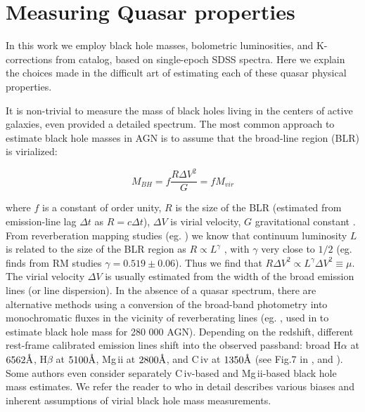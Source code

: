 \documentclass[twocolumn]{aastex62}
\let\oldAA\AA
\renewcommand{\AA}{\text{\normalfont\oldAA}}
\begin{document}
\appendix
\section{Measuring Quasar properties} 
\label{app:measureBHmass}
In this work we employ black hole masses, bolometric luminosities, and K-corrections from \cite{shen2011} catalog, based on single-epoch SDSS spectra. Here we explain the choices made in the difficult art of estimating each of these quasar physical properties.

It is non-trivial to measure the mass of black holes living in the centers of active galaxies, even provided a detailed spectrum. The most common  approach to estimate black hole masses in AGN is to assume that the broad-line region (BLR) is virialized:


\begin{equation}
M_{BH} = f \frac{ R\Delta V^{2} }{G} = f M_{vir}
\end{equation}


where $f$ is a constant of order unity, $R$ is the size of the BLR (estimated from  emission-line lag $\Delta t$ as $R = c \Delta t$), $\Delta V$ is virial velocity, $G$ gravitational constant \citep{shen2008}.  From reverberation mapping studies (eg. \citealt{shen2018}) we know that continuum luminosity $L$ is related to the size of the BLR region as $R \propto L^{\gamma}$ \citep{vestergaard2006}, with $\gamma$ very close to $1/2$ (eg. \citealt{bentz2009} finds from RM studies $\gamma = 0.519 \pm 0.06$). Thus we find  that $R \Delta V^{2} \propto L^{\gamma} \Delta V^{2} \equiv \mu$. The virial velocity $\Delta V$ is usually estimated from the width of the broad emission lines (or line dispersion).  In the absence of a quasar spectrum, there are alternative methods using a conversion of the broad-band photometry into monochromatic fluxes in the vicinity of reverberating lines (eg. \citealt{kozlowski2015}, used in \citealt{kozlowski2017b} to estimate black hole mass for 280 000 AGN).   
Depending on the redshift, different rest-frame calibrated emission lines shift into the observed passband: broad H$\alpha$ at  $6562\mbox{\AA}$, H$\beta$ at  $5100 \mbox{\AA}$, Mg\,{\sc ii} at $2800\mbox{\AA}$, and C\,{\sc iv} at $1350\mbox{\AA}$ (see Fig.7 in \citealt{shen2018}, and \citealt{vestergaard2002}). Some authors even consider separately C\,{\sc iv}-based and  Mg\,{\sc ii}-based  black hole mass estimates. We refer the reader to \citet{shen2008} who in detail describes various biases and inherent assumptions of virial black hole mass measurements. 
\end{document}
